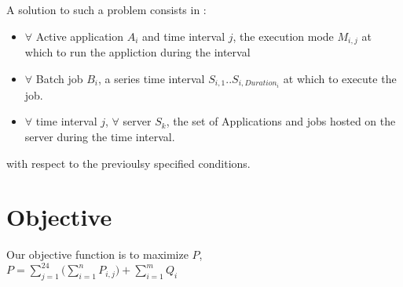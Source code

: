 \documentclass[a4paper]{article}
\begin{document}
A solution to such a problem consists in :
\begin{itemize}
\item $\forall$ Active application $A_i$ and time interval $j$, the execution mode $M_{i,j}$ at which to run the appliction during the interval
\item $\forall$ Batch job $B_i$, a series time interval $S_{i,1}..S_{i, Duration_i}$ at which to execute the job.
\item $\forall$ time interval $j$, $\forall$ server $S_k $, the set of Applications and jobs hosted on the server during the time interval.
\end{itemize}
with respect to the previoulsy specified conditions.


\section{Objective}
Our objective function is to maximize $P$,\\
$P= \sum_{j=1}^{24} \bigg( \sum_{i=1}^{n} {P_{i,j}}\bigg)  + \sum_{i=1}^{m} Q_i$
\end{document}
